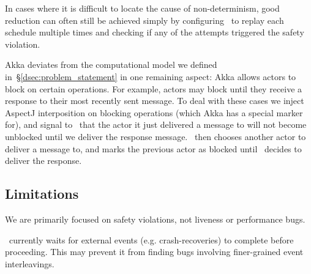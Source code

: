  In cases where it is
difficult to locate the cause of non-determinism, good reduction can often
still be achieved simply by configuring \sys~to replay each schedule
multiple times and checking if any of the attempts triggered the safety
violation.

 Akka deviates from the computational model we defined
in~\S\ref{dsec:problem_statement} in one remaining aspect: Akka allows
actors to block on certain operations. For example, actors may block until they receive
a response to their most recently sent message. To deal with these cases we inject
AspectJ interposition on blocking operations (which Akka has a special marker
for), and signal to \sys~that the
actor it just delivered a message to will not become unblocked until we
deliver the response message. \sys~then chooses another actor to deliver a
message to, and marks the previous actor as blocked until \sys~decides to
deliver the response.




\subsection{Limitations}

 We
are primarily focused on safety violations, not liveness or performance bugs.

 \sys~currently waits for external
events (e.g. crash-recoveries) to complete before proceeding. This may prevent it from finding
bugs involving finer-grained event interleavings.

